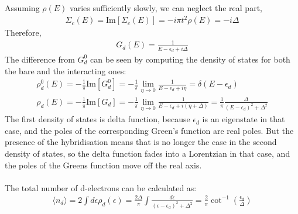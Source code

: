 \documentclass[twoside]{report}
\numberwithin{equation}{section}
\begin{document}
Assuming \(\rho(E)\) varies sufficiently slowly, we can neglect the real part,
\begin{equation}\begin{aligned}
	\Sigma_c(E) = \text{Im}\left[\Sigma_c(E)\right] = -i\pi t^2 \rho(E) = -i\Delta
\end{aligned}\end{equation}
Therefore,
\begin{equation}\begin{aligned}
G_d(E) = \frac{1}{E-\epsilon_d+i\Delta}
\end{aligned}\end{equation}
The difference from \(G^0_d\) can be seen by computing the density of states for both the bare and the interacting ones:
\begin{gather}
	\rho_d^0(E) = -\frac{1}{\pi}\text{Im}\left[G^0_d\right] = -\frac{1}{\pi} \lim_{\eta \rightarrow 0} \frac{1}{E - \epsilon_d + i\eta} = \delta(E - \epsilon_d)\\
	\rho_d(E) = -\frac{1}{\pi}\text{Im}\left[G_d\right]= -\frac{1}{\pi} \lim_{\eta \rightarrow 0} \frac{1}{E - \epsilon_d + i(\eta+\Delta)} = \frac{1}{\pi}\frac{\Delta}{(E-\epsilon_d)^2 + \Delta^2}\label{densitys}
\end{gather}
The first density of states is delta function, because \(\epsilon_d\) is an eigenstate in that case, and the poles of the corresponding Green's function are real poles.
But the presence of the hybridisation means that is no longer the case in the second density of states, so the delta function fades into a Lorentzian in that case, and the poles of the Greens function move off the real axis.
\\\\The total number of d-electrons can be calculated as:
\begin{equation}\begin{aligned}
	\label{total}
	\langle  n_d\rangle = 2\int d\epsilon \rho_d(\epsilon) = \frac{2\Delta}{\pi} \int \frac{d\epsilon}{(\epsilon-\epsilon_d)^2 + \Delta^2} = \frac{2}{\pi}\cot^{-1}\left(\frac{\epsilon_d}{\Delta}\right)
\end{aligned}\end{equation}
\end{document}
